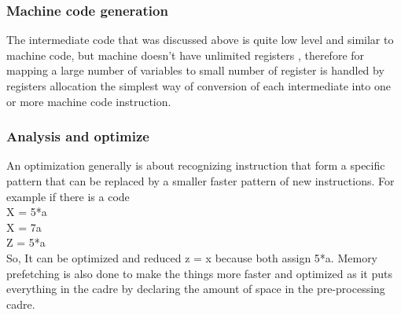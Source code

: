\documentclass[23pt]{article}
\begin{document}
\subsubsection{Machine code generation}
{\Large The intermediate code that was discussed above is quite low level and similar to machine code, but machine doesn’t have unlimited registers , therefore for mapping a large number of variables to small number of register is handled by registers allocation the simplest way of conversion of each intermediate into one or more machine code instruction. \par}

\subsubsection{Analysis and optimize}
{\Large An optimization generally is about recognizing instruction that form a specific pattern that can be replaced by a smaller faster pattern of new instructions. For example if there is a code \\
X = 5*a \\
X = 7a \\
Z = 5*a \\
So, It can be optimized and reduced z = x because both assign 5*a. Memory prefetching is also done to make the things more faster and optimized as it puts everything in the cadre by declaring the amount of space in the pre-processing cadre. \par}
\end{document}
